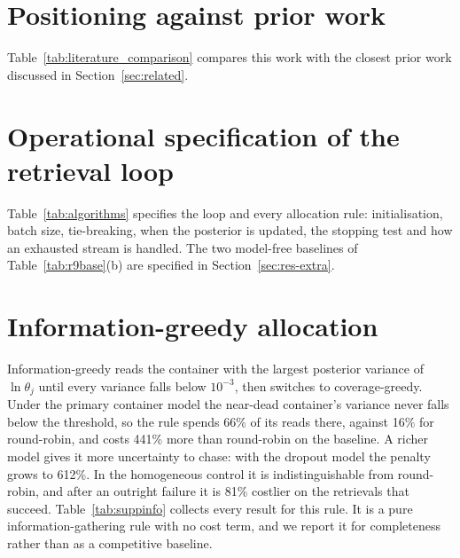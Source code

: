 \documentclass[acmsmall,screen]{acmart}
\begin{document}
\section{Positioning against prior work}\label{supp:lit}
Table~\ref{tab:literature_comparison} compares this work with the closest prior work discussed in
Section~\ref{sec:related}.


\section{Operational specification of the retrieval loop}\label{supp:alg}
Table~\ref{tab:algorithms} specifies the loop and every allocation rule: initialisation, batch size,
tie-breaking, when the posterior is updated, the stopping test and how an exhausted stream is handled.
The two model-free baselines of Table~\ref{tab:r9base}(b) are specified in Section~\ref{sec:res-extra}.


\section{Information-greedy allocation}\label{supp:info}
Information-greedy reads the container with the largest posterior variance of $\ln\theta_j$ until every
variance falls below $10^{-3}$, then switches to coverage-greedy.  Under the primary container model the
near-dead container's variance never falls below the threshold, so the rule spends 66\% of its reads
there, against 16\% for round-robin, and costs 441\% more than round-robin on the baseline.  A richer
model gives it more uncertainty to chase: with the dropout model the penalty grows to 612\%.  In the
homogeneous control it is indistinguishable from round-robin, and after an outright failure it is 81\%
costlier on the retrievals that succeed.  Table~\ref{tab:suppinfo} collects every result for this rule.
It is a pure information-gathering rule with no cost term, and we report it for completeness rather than
as a competitive baseline.


\end{document}
